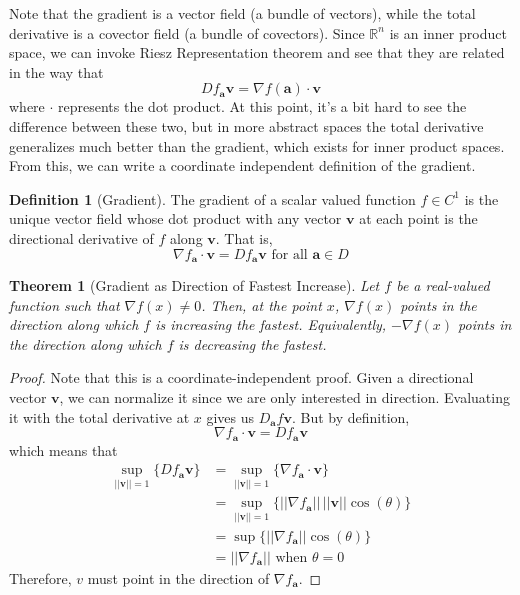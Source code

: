 \documentclass{article}
\newtheorem{theorem}{Theorem}[section]
\theoremstyle{remark}
\theoremstyle{definition}
\newtheorem{definition}{Definition}[section]
\begin{document}
Note that the gradient is a vector field (a bundle of vectors), while the total derivative is a covector field (a bundle of covectors). Since $\mathbb{R}^n$ is an inner product space, we can invoke Riesz Representation theorem and see that they are related in the way that 
\[D f_\mathbf{a} \mathbf{v} = \nabla f (\mathbf{a}) \cdot \mathbf{v}\]
where $\cdot$ represents the dot product. At this point, it's a bit hard to see the difference between these two, but in more abstract spaces the total derivative generalizes much better than the gradient, which exists for inner product spaces. From this, we can write a coordinate independent definition of the gradient. 

\begin{definition}[Gradient]
The gradient of a scalar valued function $f \in C^1$ is the unique vector field whose dot product with any vector $\mathbf{v}$ at each point is the directional derivative of $f$ along $\mathbf{v}$. That is, 
\[\nabla f_\mathbf{a} \cdot \mathbf{v} = D f_\mathbf{a} \mathbf{v} \text{ for all } \mathbf{a} \in D\]
\end{definition}

\begin{theorem}[Gradient as Direction of Fastest Increase]
Let $f$ be a real-valued function such that $\nabla f(x) \neq 0$. Then, at the point $x$, $\nabla f(x)$ points in the direction along which $f$ is increasing the fastest. Equivalently, $-\nabla f(x)$ points in the direction along which $f$ is decreasing the fastest. 
\end{theorem}
\begin{proof}
Note that this is a coordinate-independent proof. Given a directional vector $\mathbf{v}$, we can normalize it since we are only interested in direction. Evaluating it with the total derivative at $x$ gives us $D_\mathbf{a} f \mathbf{v}$. But by definition, 
\[\nabla f_\mathbf{a} \cdot \mathbf{v} = D f_\mathbf{a} \mathbf{v}\]
which means that 
\begin{align*}
    \sup_{||\mathbf{v}|| = 1} \{D f_\mathbf{a} \mathbf{v}\} & = \sup_{||\mathbf{v}||=1} \{\nabla f_\mathbf{a} \cdot \mathbf{v}\} \\
    & = \sup_{||\mathbf{v}||=1} \{ ||\nabla f_\mathbf{a}|| \, ||\mathbf{v}|| \cos(\theta)\} \\
    & = \sup \{||\nabla f_\mathbf{a}|| \cos(\theta)\} \\
    & = ||\nabla f_\mathbf{a}|| \text{ when } \theta = 0
\end{align*}
Therefore, $v$ must point in the direction of $\nabla f_\mathbf{a}$. 
\end{proof}
\end{document}
